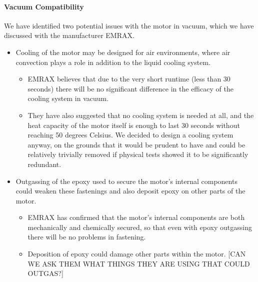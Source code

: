 \documentclass[main.tex]{subfile}
\begin{document}
    \paragraph{Vacuum Compatibility}
    We have identified two potential issues with the motor in vacuum, which we have discussed with the manufacturer EMRAX.
    \begin{itemize}
        \item Cooling of the motor may be designed for air environments, where air convection plays a role in addition to the liquid cooling system.
        \begin{itemize}
            \item EMRAX believes that due to the very short runtime (less than 30 seconds) there will be no significant difference in the efficacy of the cooling system in vacuum.
            \item They have also suggested that no cooling system is needed at all, and the heat capacity of the motor itself is enough to last 30 seconds without reaching 50 degrees Celsius. We decided to design a cooling system anyway, on the grounds that it would be prudent to have and could be relatively trivially removed if physical tests showed it to be significantly redundant.
        \end{itemize}
        \item Outgassing of the epoxy used to secure the motor’s internal components could weaken these fastenings and also deposit epoxy on other parts of the motor.
        \begin{itemize}
            \item EMRAX has confirmed that the motor’s internal components are both mechanically and chemically secured, so that even with epoxy outgassing there will be no problems in fastening.
            \item Deposition of epoxy could damage other parts within the motor. [CAN WE ASK THEM WHAT THINGS THEY ARE USING THAT COULD OUTGAS?]
        \end{itemize}
    \end{itemize}
\end{document}
